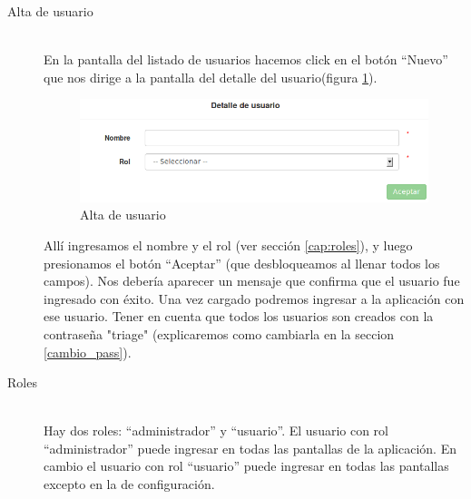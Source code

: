 \begin{description}
\item[Alta de usuario] \mbox{} \\
En la pantalla del listado de usuarios hacemos click en el botón ``Nuevo'' que nos dirige a la pantalla del detalle del usuario(figura \ref{fig:nuevo_usuario}).
\begin{figure}
\centerline{\includegraphics[width=1\textwidth]{nuevo_usuario.png}}
\caption{Alta de usuario}
\label{fig:nuevo_usuario}
\end{figure}
Allí ingresamos el nombre y el rol (ver sección \ref{cap:roles}), y luego presionamos el botón ``Aceptar'' (que desbloqueamos al llenar todos los campos). Nos debería aparecer un mensaje que confirma que el usuario fue ingresado con éxito. Una vez cargado podremos ingresar a la aplicación con ese usuario. Tener en cuenta que todos los usuarios son creados con la contraseña "triage" (explicaremos como cambiarla en la seccion \ref{cambio_pass}).

\item[Roles] \mbox{} \\
Hay dos roles: ``administrador'' y ``usuario''. El usuario con rol ``administrador'' puede ingresar en todas las pantallas de la aplicación. En cambio el usuario con rol ``usuario'' puede ingresar en todas las pantallas excepto en la de configuración.


\end{description}
